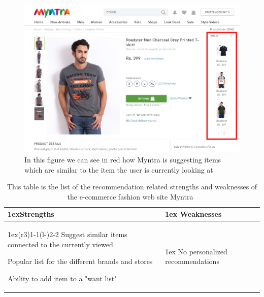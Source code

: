     \begin{figure}[H]
        \centering
        \includegraphics[width=5in]{image/myntiaSimilarExample.png}
        \caption[Example of Myntra's "similar item" approach]{In this figure we can see in red how Myntra is suggesting items which are similar to the item the user is currently looking at}
        \label{figure:myntiaSimilarEx}
    \end{figure}
    
    \begin{table}[H]
        \centering
        \begin{tabularx}{\linewidth}{>{\parskip1ex}X@{\kern4\tabcolsep}>{\parskip1ex}X}
            \toprule
            \hfil\bfseries Strengths
            &
            \hfil\bfseries Weaknesses
            \\\cmidrule(r{3\tabcolsep}){1-1}\cmidrule(l{-\tabcolsep}){2-2}
	        Suggest similar items connected to the currently viewed \par
            Popular list for the different brands and stores \par
            Ability to add item to a "want list"\par
            &
            No personalized recommendations \par
            \\\bottomrule
        \end{tabularx}
        \caption[Recommendation related strengths and weaknesses of Myntra~\cite{myntra}]{This table is the list of the recommendation related strengths and weaknesses of the e-commerce fashion web site Myntra~\cite{myntra}}
        \label{table:ecommerceMyntra}
    \end{table}

